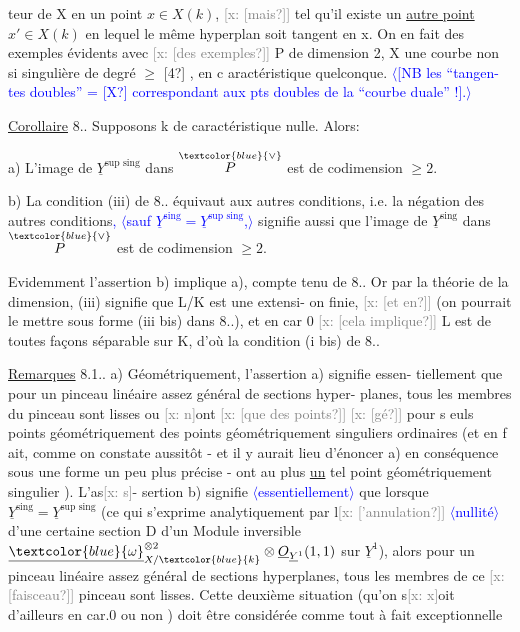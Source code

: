 \documentclass[11pt]{article}
\newcommand{\scanpage}[1]{\par\bigskip\noindent{\small\sffamily[scan #1]}\par}
\newcommand{\mspage}[1]{{\small\sffamily[p.\,#1]}}
\newcommand{\hand}[1]{\textcolor{blue}{#1}}
\let\over\relax
\newcommand{\over}[2]{\textcolor{gray}{#1}\textcolor{blue}{\ensuremath{^{\!\nearrow}}#2}}
\newcommand{\inserted}[2][]{\textcolor{blue}{$\langle$#2$\rangle$}}
\newcommand{\xout}[1]{\textcolor{gray}{[\textsf{x:} #1]}}
\newcommand{\uline}[1]{\underline{#1}}
\newcommand{\unsure}[1]{[#1?]}
\begin{document}
\clearpage
\scanpage{25/46}
\mspage{42}

teur de X en un point $x\in X(k)$, \xout{\unsure{mais}} tel qu'il existe un \uline{autre point}
$x'\in X(k)$ en lequel le même hyperplan soit tangent en x. On en fait des
exemples évidents avec \xout{\unsure{des exemples}} P de dimension 2, X une courbe non si
singulière de degré $\geqslant$ \unsure{4} , en c aractéristique quelconque. \inserted{[NB les ``tangen-tes doubles'' = \unsure{X} correspondant aux pts doubles de la ``courbe duale'' !].}

\uline{Corollaire} 8.\over{\unsure{10}}{11}. Supposons k de caractéristique nulle. Alors:

a) L'image de $\underline{Y}^{\text{sup sing}}$ dans $\overset{\hand{\vee}}{P}$ est de codimension $\geqslant 2$.

b) La condition (iii) de 8.\over{\unsure{7}}{8}. équivaut aux autres conditions, i.e.
la négation des autres conditions\hand{,} \inserted{sauf $\underline{Y}^{\text{sing}}=\underline{Y}^{\text{sup sing}}$,} signifie aussi que l'image de $\underline{Y}^{\text{sing}}$
dans $\overset{\hand{\vee}}{P}$ est de codimension $\geqslant 2$.

Evidemment l'assertion b) implique a), compte tenu de 8.\over{\unsure{7}}{8}. Or
par la théorie de la dimension, (iii) signifie que L/K est une extensi-%
on finie, \xout{\unsure{et en}} (on pourrait le mettre sous forme (iii bis) dans 8.\over{\unsure{7}}{8}.),
et en car 0 \xout{\unsure{cela implique}} L est de toutes façons séparable sur K, d'où
la condition (i bis) de 8.\over{\unsure{7}}{8}.

\uline{Remarques} 8.1\over{1}{2}.. a) Géométriquement, l'assertion a) signifie essen-%
tiellement que pour un pinceau linéaire assez général de sections hyper-%
planes, tous les membres du pinceau sont lisses ou \xout{n}ont \xout{\unsure{que des points}}
\xout{\unsure{gé}} pour s euls points géométriquement des points géométriquement
singuliers ordinaires (et en f ait, comme on constate aussitôt - et il
y aurait lieu d'énoncer a) en conséquence sous une forme un peu plus
précise - ont au plus \uline{un} tel point géométriquement singulier ). L'as\xout{s}-%
sertion b) signifie \inserted{essentiellement} que lorsque $\underline{Y}^{\text{sing}}=\underline{Y}^{\text{sup sing}}$ (ce qui s'exprime
analytiquement par l\xout{\unsure{'annulation}} \inserted[typed]{nullité} d'une certaine section D d'un Module
inversible $\underline{\hand{\omega}}^{\otimes 2}_{X/\hand{k}}\otimes\underline{O}_{\underline{Y}^1}(1,1)$ sur $\underline{Y}^1$), alors pour un pinceau linéaire
assez général de sections hyperplanes, tous les membres de ce \xout{\unsure{faisceau}}
pinceau sont lisses. Cette deuxième situation (qu'on s\xout{x}oit d'ailleurs
en car.0 ou non ) doit être considérée comme tout à fait exceptionnelle
\end{document}
